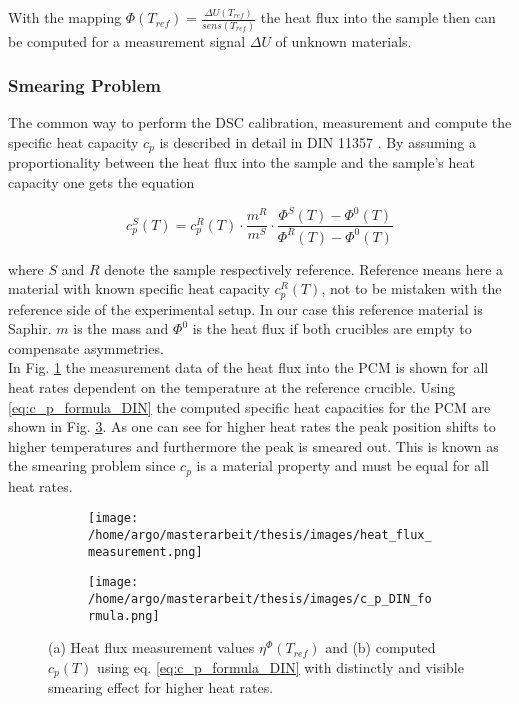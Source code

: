 \documentclass{scrartcl}[12pt, halfparskip]
\numberwithin{equation}{section}
\numberwithin{figure}{section}
\numberwithin{table}{section}
\begin{document}
With the mapping $\Phi(T_{ref}) = \frac{\Delta U(T_{ref})}{sens(T_{ref})}$ the heat flux into the sample then can be computed for a measurement signal $\Delta U$ of unknown materials. 




\subsubsection{Smearing Problem}
\label{sec:smearing_problem}
The common way to perform the DSC calibration, measurement and compute the specific heat capacity $c_p$ is described in detail in DIN 11357 \cite{DIN_11357}. By assuming a proportionality between the heat flux into the sample and the sample's heat capacity one gets the equation

\begin{equation}
	c_p^S(T) = c_p^{R}(T) \cdot \frac{m^R}{m^S} \cdot \frac{\Phi^S(T) - \Phi^0(T)}{\Phi^R(T) - \Phi^0(T)}
	\label{eq:c_p_formula_DIN}
\end{equation}

where $S$ and $R$ denote the sample respectively reference. Reference means here a material with known specific heat capacity $c_p^R(T)$, not to be mistaken with the reference side of the experimental setup. In our case this reference material is Saphir. $m$ is the mass and $\Phi^0$ is the heat flux if both crucibles are empty to compensate asymmetries. \\
In Fig. \ref{fig:heat_flux_measurements} the measurement data of the heat flux into the PCM is shown for all heat rates dependent on the temperature at the reference crucible. Using \eqref{eq:c_p_formula_DIN} the computed specific heat capacities for the PCM are shown in Fig. \ref{fig:c_p_DIN_formula}. As one can see for higher heat rates the peak position shifts to higher temperatures and furthermore the peak is smeared out. This is known as the smearing problem since $c_p$ is a material property and must be equal for all heat rates.


\begin{figure}[H]
	\centering
	\begin{subfigure}{0.7\textwidth}
		\texttt{[image: /home/argo/masterarbeit/thesis/images/heat\_flux\_measurement.png]}
		\caption{}
		\label{fig:heat_flux_measurements}
	\end{subfigure}
	\begin{subfigure}{0.7\textwidth}
		\texttt{[image: /home/argo/masterarbeit/thesis/images/c\_p\_DIN\_formula.png]}
		\caption{}
		\label{fig:c_p_DIN_formula}
	\end{subfigure}
	\caption{(a) Heat flux measurement values $\eta^{\varPhi}(T_{ref})$ and (b) computed $c_p(T)$ using eq. \eqref{eq:c_p_formula_DIN} with distinctly and visible smearing effect for higher heat rates.}
\end{figure}
\end{document}
